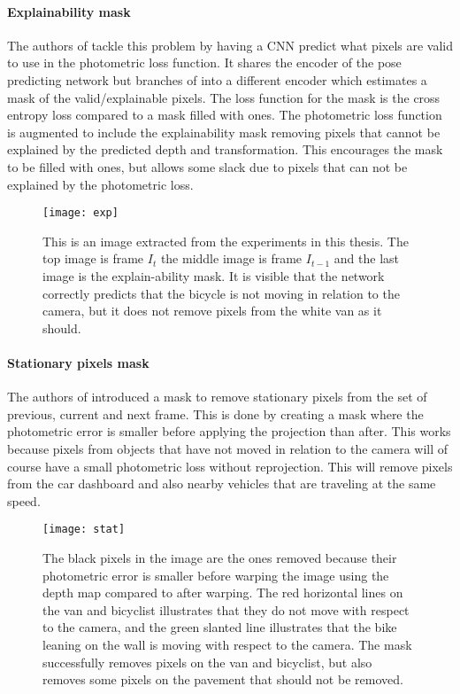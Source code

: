 \paragraph{Explainability mask} The authors of \cite{sfmlearner} tackle this problem by having a CNN predict what pixels are valid to use in the photometric loss function. It shares the encoder of the pose predicting network but branches of into a different encoder which estimates a mask of the valid/explainable pixels. The loss function for the mask is the cross entropy loss compared to a mask filled with ones. The photometric loss function is augmented to include the explainability mask removing pixels that cannot be explained by the predicted depth and transformation. This encourages the mask to be filled with ones, but allows some slack due to pixels that can not be explained by the photometric loss.

\begin{figure}[H]
	\centering
	\texttt{[image: exp]}
	\caption{This is an image extracted from the experiments in this thesis. The top image is frame $I_t$ the middle image is frame $I_{t-1}$ and the last image is the explain-ability mask. It is visible that the network correctly predicts that the bicycle is not moving in relation to the camera, but it does not remove pixels from the white van as it should.}
	\label{fig:exp}
\end{figure}

\paragraph{Stationary pixels mask} The authors of \cite{monodepth2} introduced a mask to remove stationary pixels from the set of previous, current and next frame. This is done by creating a mask where the photometric error is smaller before applying the projection than after. This works because pixels from objects that have not moved in relation to the camera will of course have a small photometric loss without reprojection. This will remove pixels from the car dashboard and also nearby vehicles that are traveling at the same speed.

\begin{figure}[H]
	\centering
	\texttt{[image: stat]}
	\caption{The black pixels in the image are the ones removed because their photometric error is smaller before warping the image using the depth map compared to after warping. The red horizontal lines on the van and bicyclist illustrates that they do not move with respect to the camera, and the green slanted line illustrates that the bike leaning on the wall is moving with respect to the camera. The mask successfully removes pixels on the van and bicyclist, but also removes some pixels on the pavement that should not be removed.}
	\label{fig:stat}
\end{figure}